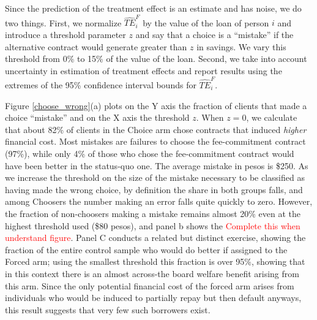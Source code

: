 \documentclass[oneside,11pt]{article}
\begin{document}


Since the prediction of the treatment effect is an estimate and has noise, we do two things. First, we normalize $\widehat{TE}^{F}_{i}$ by the value of the loan of person $i$ and introduce a threshold parameter $z$ and say that a choice is a ``mistake'' if the alternative contract would generate greater than $z$ in savings. We vary this threshold from 0\% to 15\% of the value of the loan. Second, we take into account uncertainty in estimation of treatment effects and report results using the extremes of the 95\% confidence interval bounds for $\widehat{TE}^{F}_{i}$.

Figure \ref{choose_wrong}(a) plots on the Y axis the fraction of clients that made a choice ``mistake'' and on the X axis the threshold $z$. When $z=0$, we calculate that about 82\% of clients in the Choice arm chose contracts that induced \textit{higher} financial cost. Most mistakes are failures to choose the fee-commitment contract ({97}\%), while only {4}\% of those who chose the fee-commitment contract would have been better in the status-quo one. The average mistake in pesos is \$250. %
As we increase the threshold on the size of the mistake necessary to be classified as having made the wrong choice, by definition the share in both groups falls, and among Choosers the number making an error falls quite quickly to zero.  However, the fraction of non-choosers making a mistake remains almost 20\% even at the highest threshold used (\$80 pesos), and panel b shows the \textcolor{red}{Complete this when understand figure}.  Panel C conducts a related but distinct exercise, showing the fraction of the entire control sample who would do better if assigned to the Forced arm; using the smallest threshold this fraction is over 95\%, showing that in this context there is an almost across-the board welfare benefit arising from this arm.  Since the only potential financial cost of the forced arm arises from individuals who would be induced to partially repay but then default anyways, this result suggests that very few such borrowers exist.
\end{document}
